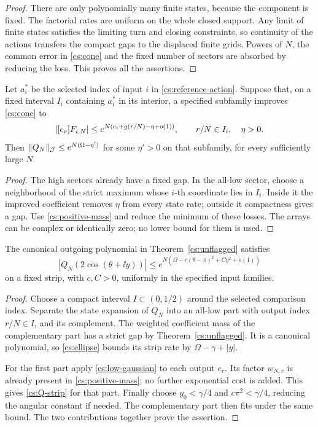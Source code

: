 \begin{proof}
There are only polynomially many finite states, because the component
is fixed. The factorial rates are uniform on the whole closed support.
Any limit of finite states satisfies the limiting turn and closing
constraints, so continuity of the actions transfers the compact gaps
to the displaced finite grids. Powers of \(N\), the common error in
\eqref{cs:cone} and the fixed number of sectors are absorbed by
reducing the loss. This proves all the assertions.
\end{proof}

\begin{corollary}\label{cs:loss-transfer}
Let \(a_i^*\) be the selected index of input \(i\) in
\eqref{cs:reference-action}. Suppose that, on a fixed interval \(I_i\)
containing \(a_i^*\) in its interior, a specified subfamily improves
\eqref{cs:cone} to
\begin{equation}\label{cs:input-loss}
 |[e_{r}]F_{i,N}|\le e^{N(c_i+g(r/N)-\eta+o(1))},
 \qquad r/N\in I_i,\quad \eta>0.
\end{equation}
Then \(\lVert Q_N\rVert_{\mathcal J}\le e^{N(\Omega-\eta')}\) for some \(\eta'>0\)
on that subfamily, for every sufficiently large \(N\).
\end{corollary}
\begin{proof}
The high sectors already have a fixed gap. In the all-low sector,
choose a neighborhood of the strict maximum whose \(i\)-th coordinate
lies in \(I_i\). Inside it the improved coefficient removes
\(\eta\) from every state rate; outside it compactness gives a gap.
Use \eqref{cs:positive-mass} and reduce the minimum of these losses.
The arrays can be complex or identically zero; no lower bound for
them is used.
\end{proof}

\begin{proposition}\label{cs:probe-strip}
The canonical outgoing polynomial in Theorem~\ref{cs:unflagged}
satisfies
\begin{equation}\label{cs:Q-strip}
 |Q_N(2\cos(\theta+\ii y))|
 \le e^{N(\Omega-c(\theta-\pi)^2+Cy^2+o(1))}
\end{equation}
on a fixed strip, with \(c,C>0\), uniformly in the specified input families.
\end{proposition}
\begin{proof}
Choose a compact interval \(I\subset(0,1/2)\) around the selected
comparison index. Separate the state expansion of \(Q_N\)
into an all-low part with output index \(r/N\in I\), and its
complement. The weighted coefficient mass of the complementary part
has a strict gap by Theorem~\ref{cs:unflagged}. It is a canonical
polynomial, so \eqref{cs:ellipse} bounds its strip rate by
\(\Omega-\gamma+|y|\).

For the first part apply \eqref{cs:low-gaussian} to each output
\(e_r\). Its factor \(w_{N,r}\) is already present in
\eqref{cs:positive-mass}; no further exponential cost is added.
This gives \eqref{cs:Q-strip} for that part. Finally choose
\(y_0<\gamma/4\) and \(c\pi^2<\gamma/4\), reducing the angular
constant if needed. The complementary part then fits under the same
bound. The two contributions together prove the assertion.
\end{proof}
